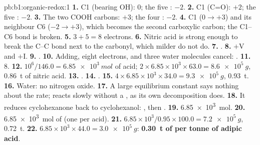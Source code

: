 \begin{solution}{pb:b1:organic-redox:1}
\textbf{1.} C1 (bearing OH): 0; the five : $-2$.
\textbf{2.} C1 (C=O): $+2$; the five : $-2$.
\textbf{3.} The two COOH carbons: $+3$; the four : $-2$.
\textbf{4.} C1 ($0 \to +3$) and its neighbour C6 ($-2 \to +3$), which
becomes the second carboxylic carbon; the C1--C6 bond is broken.
\textbf{5.} $3 + 5 = 8$ electrons.
\textbf{6.} Nitric acid is strong enough to break the C--C bond next to the
carbonyl, which milder  do not do.
\textbf{7.} .
\textbf{8.} $+$V and $+$I.
\textbf{9.} .
\textbf{10.} Adding, eight electrons,  and three water molecules
cancel: .
\textbf{11.} 8.
\textbf{12.} $10^6/146.0 = \qty{6.85e3}{mol}$ of acid; $2 \times 6.85 \times
10^3 \times 63.0 = \qty{8.6e5}{g}$, \qty{0.86}{t} of nitric acid.
\textbf{13.} .
\textbf{14.} .
\textbf{15.} $4 \times 6.85 \times 10^3 \times 34.0 = \qty{9.3e5}{g}$,
\qty{0.93}{t}.
\textbf{16.} Water: no nitrogen oxide.
\textbf{17.} A large equilibrium constant says nothing about the rate;
 reacts slowly without a , as its own decomposition does.
\textbf{18.} It reduces cyclohexanone back to cyclohexanol:
, then
.
\textbf{19.} \qty{6.85e3}{mol}.
\textbf{20.} \qty{6.85e3}{mol} of  (one per acid).
\textbf{21.} $6.85 \times 10^3/0.95 \times 100.0 = \qty{7.2e5}{g}$, \qty{0.72}{t}.
\textbf{22.} $6.85 \times 10^3 \times 44.0 = \qty{3.0e5}{g}$: \textbf{\qty{0.30}{t}
of  per tonne of adipic acid}.
\end{solution}
